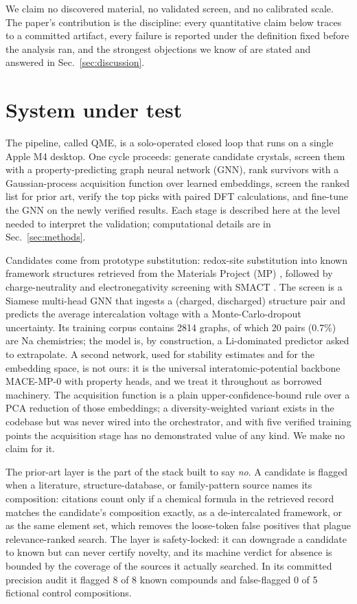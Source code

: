 \documentclass[reprint,aps,prb,amsmath,amssymb,nofootinbib,longbibliography]{revtex4-2}
\begin{document}
We claim no discovered material, no validated screen, and no calibrated
scale. The paper's contribution is the discipline: every quantitative claim
below traces to a committed artifact, every failure is reported under the
definition fixed before the analysis ran, and the strongest objections we
know of are stated and answered in Sec.~\ref{sec:discussion}.

\section{System under test}
\label{sec:system}

The pipeline, called QME, is a solo-operated closed loop that runs on a single
Apple M4 desktop. One cycle proceeds: generate candidate crystals, screen them
with a property-predicting graph neural network (GNN), rank survivors with a
Gaussian-process acquisition function over learned embeddings, screen the
ranked list for prior art, verify the top picks with paired DFT calculations,
and fine-tune the GNN on the newly verified results. Each stage is described
here at the level needed to interpret the validation; computational details
are in Sec.~\ref{sec:methods}.

Candidates come from prototype substitution: redox-site substitution into
known framework structures retrieved from the Materials Project (MP)
\cite{jain2013}, followed by charge-neutrality and electronegativity screening
with SMACT \cite{davies2019}. The screen is a Siamese multi-head GNN that
ingests a (charged, discharged) structure pair and predicts the average
intercalation voltage with a Monte-Carlo-dropout uncertainty. Its training
corpus contains 2814 graphs, of which 20 pairs (0.7\%) are Na
chemistries; the model is, by construction, a Li-dominated predictor asked to
extrapolate. A second network, used for stability estimates and for the
embedding space, is not ours: it is the universal interatomic-potential
backbone MACE-MP-0 \cite{batatia2022,batatia2024} with property heads, and we
treat it throughout as borrowed machinery. The acquisition function is a
plain upper-confidence-bound rule over a PCA reduction of those embeddings; a
diversity-weighted variant exists in the codebase but was never wired into the
orchestrator, and with five verified training points the acquisition stage has
no demonstrated value of any kind. We make no claim for it.

The prior-art layer is the part of the stack built to say \emph{no}. A
candidate is flagged when a literature, structure-database, or family-pattern
source names its composition: citations count only if a chemical formula in
the retrieved record matches the candidate's composition exactly, as a
de-intercalated framework, or as the same element set, which removes the
loose-token false positives that plague relevance-ranked search. The layer is
safety-locked: it can downgrade a candidate to known but can never certify
novelty, and its machine verdict for absence is bounded by the coverage of the
sources it actually searched. In its committed precision audit it flagged
8 of 8 known compounds and false-flagged 0 of 5 fictional control
compositions.
\end{document}

